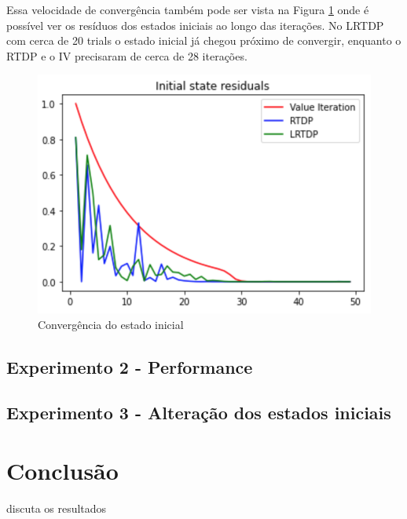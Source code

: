 \documentclass[letterpaper]{article}
\begin{document}
Essa velocidade de convergência também pode ser vista na Figura \ref{fig:initial-state-convergency} onde é possível ver os resíduos dos estados iniciais ao longo das iterações. No LRTDP com cerca de 20 trials o estado inicial já chegou próximo de convergir, enquanto o RTDP e o IV precisaram de cerca de 28 iterações.

\begin{figure}[t]
    \centering
    \includegraphics[width=0.9\columnwidth]{initial-state-convergency-01}
    \caption{Convergência do estado inicial}
    \label{fig:initial-state-convergency}
\end{figure}


\subsection{Experimento 2 - Performance}


\subsection{Experimento 3 - Alteração dos estados iniciais}


\section{Conclusão}
discuta os resultados



\end{document}
